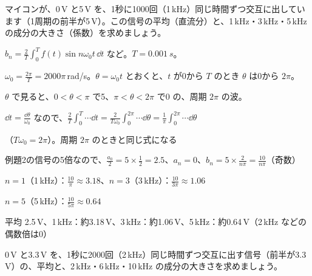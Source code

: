 \begin{reidai}
マイコンが、0\,V と5\,V を、1秒に1000回（1\,kHz）同じ時間ずつ交互に出しています（1周期の前半が5\,V）。この信号の平均（直流分）と、1\,kHz・3\,kHz・5\,kHz の成分の大きさ（係数）を求めましょう。\par
\kangaekata {}\par
{}\enspace $b_n=\frac{2}{T}\int_0^Tf(t)\sin n\omega_0t\,\dd t$ など。$T=\qty{0.001}{s}$。\par
{}\enspace $\omega_0=\frac{2\pi}{T}=2000\pi$\,rad/s。$\theta=\omega_0t$ とおくと、$t$ が0から $T$ のとき $\theta$ は0から $2\pi$。\par
{}\enspace $\theta$ で見ると、$0<\theta<\pi$ で5、$\pi<\theta<2\pi$ で0 の、周期 $2\pi$ の波。\par
\shiki\kixbs $\dd t=\frac{\dd\theta}{\omega_0}$ なので、$\frac{2}{T}\int_0^T\cdots\dd t=\frac{2}{T\omega_0}\int_0^{2\pi}\cdots\dd\theta=\frac{1}{\pi}\int_0^{2\pi}\cdots\dd\theta$\par
\kixbb （$T\omega_0=2\pi$）。周期 $2\pi$ のときと同じ式になる\par
\kixba 例題2の信号の5倍なので、$\frac{a_0}{2}=5\times\frac12=2.5$、$a_n=0$、$b_n=5\times\frac{2}{n\pi}=\frac{10}{n\pi}$（奇数）\par
\kixba $n=1$（1\,kHz）：$\frac{10}{\pi}\approx3.18$、$n=3$（3\,kHz）：$\frac{10}{3\pi}\approx1.06$\par
\kixba $n=5$（5\,kHz）：$\frac{10}{5\pi}\approx0.64$\par
\kotae 平均 2.5\,V、1\,kHz：約3.18\,V、3\,kHz：約1.06\,V、5\,kHz：約0.64\,V（2\,kHz などの偶数倍は0）
\end{reidai}

\begin{jibun}
0\,V と3.3\,V を、1秒に2000回（2\,kHz）同じ時間ずつ交互に出す信号（前半が3.3\,V）の、平均と、2\,kHz・6\,kHz・10\,kHz の成分の大きさを求めましょう。
\end{jibun}

